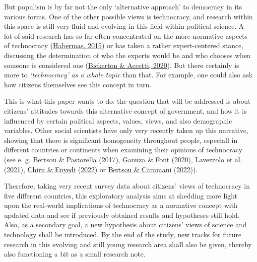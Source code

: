 \documentclass[
  12pt,
  english,
]{article}
\begin{document}
But populism is by far not the only `alternative approach' to democracy
in its various forms. One of the other possible views is technocracy,
and research within this space is still very fluid and evolving in this
field within political science. A lot of said research has so far often
concentrated on the more normative aspects of technocracy
(\protect\hyperlink{ref-habermas2015lure}{Habermas, 2015}) or has taken
a rather expert-centered stance, discussing the determination of who the
experts would be and who chooses when someone is considered one
(\protect\hyperlink{ref-bickerton2020technocracy}{Bickerton \& Accetti,
2020}). But there certainly is more to \emph{`technocracy' as a whole
topic} than that. For example, one could also ask how citizens
themselves see this concept in turn.

This is what this paper wants to do: the question that will be addressed
is about citizens' attitudes towards this alternative concept of
government, and how it is influenced by certain political aspects,
values, views, and also demographic variables. Other social scientists
have only very recently taken up this narrative, showing that there is
significant homogeneity throughout people, especiall in different
countries or continents when examining their opinions of technocracy
(see e. g. \protect\hyperlink{ref-bertsou2017technocratic}{Bertsou \&
Pastorella} (\protect\hyperlink{ref-bertsou2017technocratic}{2017}),
\protect\hyperlink{ref-ganuza2020experts}{Ganuza \& Font}
(\protect\hyperlink{ref-ganuza2020experts}{2020}),
\protect\hyperlink{ref-lavezzolo2021will}{Lavezzolo et al.}
(\protect\hyperlink{ref-lavezzolo2021will}{2021}),
\protect\hyperlink{ref-chiru2022wants}{Chiru \& Enyedi}
(\protect\hyperlink{ref-chiru2022wants}{2022}) or
\protect\hyperlink{ref-bertsou2022people}{Bertsou \& Caramani}
(\protect\hyperlink{ref-bertsou2022people}{2022})).

Therefore, taking very recent survey data about citizens' views of
technocracy in five different countries, this exploratory analysis aims
at shedding more light upon the real-world implications of technocracy
as a normative concept with updated data and see if previously obtained
results and hypotheses still hold. Also, as a secondary goal, a new
hypothesis about citizens' views of science and technology shall be
introduced. By the end of the study, new tracks for future research in
this evolving and still young research area shall also be given, thereby
also functioning a bit as a small research note.

\newpage{}
\end{document}

